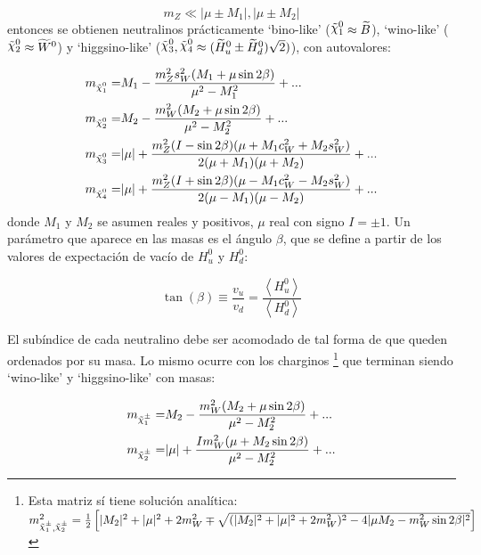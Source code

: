 \begin{equation}
	m_Z \ll |\mu \pm M_1|, |\mu \pm M_2|
\end{equation}
%
entonces se obtienen neutralinos prácticamente `bino-like' ($\ninoone \approx \widetilde{B}$), `wino-like' ($\ninotwo \approx \widetilde{W}^0$) y `higgsino-like' ($\ninothree, \ninofour \approx (\widetilde{H}_u^0 \pm \widetilde{H}_d^0)\sqrt{2})$), con autovalores:

\begin{equation}
	\begin{split}
		m_{\ninoone} = & M_1 - \frac{m_Z^2 s_W^2 (M_1 + \mu \sin{2\beta})}{\mu^2 - M_1^2} + ... \\
		m_{\ninotwo} = & M_2 - \frac{m_W^2 (M_2 + \mu \sin{2\beta})}{\mu^2 - M_2^2} + ... \\
		m_{\ninothree} = & |\mu| + \frac{m_Z^2 (I - \sin{2\beta})(\mu + M_1 c_W^2 + M_2 s_W^2)}{2 (\mu + M_1) (\mu + M_2)} + ... \\
		m_{\ninofour} = & |\mu| + \frac{m_Z^2 (I + \sin{2\beta})(\mu - M_1 c_W^2 - M_2 s_W^2)}{2 (\mu - M_1) (\mu - M_2)} + ... \\
	\end{split}
	\label{eq:nc_mass}
\end{equation}
%
donde $M_1$ y $M_2$ se asumen reales y positivos, $\mu$ real con signo $I=\pm1$. 
Un parámetro que aparece en las masas es el ángulo $\beta$, que se define a partir de los valores de expectación de vacío de $H_u^0$ y $H_d^0$:
	
\begin{equation}
	\tan(\beta) \equiv \frac{v_u}{v_d} = \frac{\left< H_u^0 \right>}{\left< H_d^0 \right>}
\end{equation}

El subíndice de cada neutralino debe ser acomodado de tal forma de que queden ordenados por su masa. Lo mismo ocurre con los charginos \footnote{Esta matriz sí tiene solución analítica: \\ $m_{\chinoonepm, \chinotwopm}^2 = \frac{1}{2} \left[ |M_2|^2 + |\mu|^2 + 2 m_W^2 \mp \sqrt{(|M_2|^2 + |\mu|^2 + 2 m_W^2)^2 - 4 |\mu M_2 - m_W^2 \sin{2\beta}|^2} \right]$} que terminan siendo `wino-like' y `higgsino-like' con masas:

\begin{equation}
	\begin{split}
		m_{\chinoonepm} = & M_2 - \frac{m_W^2 (M_2 + \mu \sin{2\beta})}{\mu^2 - M_2^2} + ... \\
		m_{\chinotwopm} = & |\mu| + \frac{I m_W^2 (\mu + M_2 \sin{2\beta})}{\mu^2 - M_2^2} + ... \\
	\end{split}
\end{equation}

